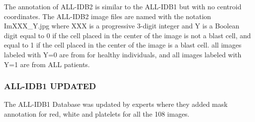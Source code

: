 \vspace{-0.14in}

The annotation of ALL-IDB2 is similar to the ALL-IDB1 but with no centroid coordinates. The ALL-IDB2 image files are named with the notation ImXXX\_Y.jpg where XXX is a progressive 3-digit integer and Y is a Boolean digit equal to 0 if the cell placed in the center of the image is not a blast cell, and equal to 1 if the cell placed in the center of the image is a blast cell. all images labeled with Y=0 are from for healthy individuals, and all images labeled with Y=1 are from ALL patients. 

\vspace{0.2in}



\subsubsection{ALL-IDB1 UPDATED}
The ALL-IDB1 Database was updated by experts where they added mask annotation for red, white and platelets for all the 108 images.
